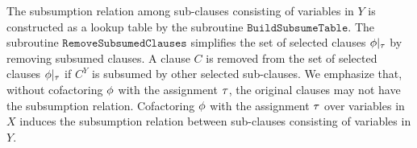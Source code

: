 The subsumption relation among sub-clauses consisting of variables in $Y$ is constructed as a lookup table by the subroutine $\mathtt{BuildSubsumeTable}$.
The subroutine $\texttt{RemoveSubsumedClauses}$ simplifies the set of selected clauses $\phi|_{\tau}$ by removing subsumed clauses.
A clause $C$ is removed from the set of selected clauses $\phi|_{\tau}$ if $C^Y$ is subsumed by other selected sub-clauses.
We emphasize that, without cofactoring $\phi$ with the assignment $\tau$,
the original clauses may not have the subsumption relation.
Cofactoring $\phi$ with the assignment $\tau$ over variables in $X$ induces the subsumption relation between sub-clauses consisting of variables in $Y$.

\iffalse
    The procedure $\mathtt{RemoveSubsumedClauses}$ for the technique is outlined in Figure~\ref{fig:subsume}.
    It takes the set of selected clauses and the lookup table of subsumption relation as input, and removes every subsumed clause via subroutine $\mathtt{CheckSubsumption}$.
    \begin{figure}[h]
        \mbox{}\hrulefill \vspace{-.6em}
        \small
        \begin{program}
            \>  {\bf \textit{RemoveSubsumedClauses}}\\
            \> \> \INPUT: The selected clauses $\phi|_{\tau}$ and a lookup table \texttt{s-table}\\ \> \> \> \> \> for subsumption\\
            \> \> \OUTPUT: A simplified set of clauses $\varphi$ without subsumed clasues\\
            \> \> \BEGIN\\
            \> \> 01 \> \> $\varphi$ := $\top$;\\
            \> \> 02 \> \> \FOREACH $C \in \phi|_{\tau}$\\
            \> \> 03 \> \> \> \IF \> $\mathtt{CheckSubsumption}(C,\texttt{s-table})$\\
            \> \> 04 \> \> \> \> \CONTI;\\
            \> \> 05 \> \> \> \ELSE\texttt{//$C^Y$ is not subsumed}\\
            \> \> 06 \> \> \> \> $\varphi$ := $\varphi \wedge C$;\\
            \> \> 07 \> \> \RETURN $\varphi$;\\
            \> \> \END
        \end{program}
        \vspace{-1.2em} \mbox{}\hrulefill \caption{\small Subroutine: Removing subsumed clauses from the set of selected clauses.}
        \label{fig:subsume}
    \end{figure}
\fi

